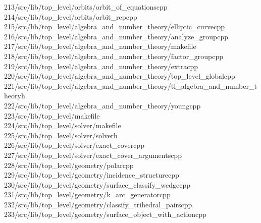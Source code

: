 \begin{tabbing}
213\>/src/lib/top\_level/orbits/orbit\_of\_equationscpp\\[0pt]
214\>/src/lib/top\_level/orbits/orbit\_repcpp\\[0pt]
215\>/src/lib/top\_level/algebra\_and\_number\_theory/elliptic\_curvecpp\\[0pt]
216\>/src/lib/top\_level/algebra\_and\_number\_theory/analyze\_groupcpp\\[0pt]
217\>/src/lib/top\_level/algebra\_and\_number\_theory/makefile\\[0pt]
218\>/src/lib/top\_level/algebra\_and\_number\_theory/factor\_groupcpp\\[0pt]
219\>/src/lib/top\_level/algebra\_and\_number\_theory/extracpp\\[0pt]
220\>/src/lib/top\_level/algebra\_and\_number\_theory/top\_level\_globalcpp\\[0pt]
221\>/src/lib/top\_level/algebra\_and\_number\_theory/tl\_algebra\_and\_number\_theoryh\\[0pt]
222\>/src/lib/top\_level/algebra\_and\_number\_theory/youngcpp\\[0pt]
223\>/src/lib/top\_level/makefile\\[0pt]
224\>/src/lib/top\_level/solver/makefile\\[0pt]
225\>/src/lib/top\_level/solver/solverh\\[0pt]
226\>/src/lib/top\_level/solver/exact\_covercpp\\[0pt]
227\>/src/lib/top\_level/solver/exact\_cover\_argumentscpp\\[0pt]
228\>/src/lib/top\_level/geometry/polarcpp\\[0pt]
229\>/src/lib/top\_level/geometry/incidence\_structurecpp\\[0pt]
230\>/src/lib/top\_level/geometry/surface\_classify\_wedgecpp\\[0pt]
231\>/src/lib/top\_level/geometry/k\_arc\_generatorcpp\\[0pt]
232\>/src/lib/top\_level/geometry/classify\_trihedral\_pairscpp\\[0pt]
233\>/src/lib/top\_level/geometry/surface\_object\_with\_actioncpp\\[0pt]

\end{tabbing}
